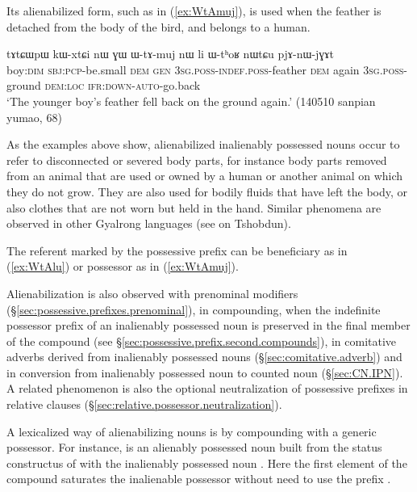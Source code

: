 Its alienabilized form, such as  in (\ref{ex:WtAmuj}), is used when the feather is detached from the body of the bird, and belongs to a human.
  
\begin{exe}
\ex \label{ex:WtAmuj}
 \gll tɤtɕɯpɯ kɯ-xtɕi nɯ ɣɯ ɯ-tɤ-muj nɯ li ɯ-tʰoʁ nɯtɕu pjɤ-nɯ-jɣɤt  \\
 boy:\textsc{dim} \textsc{sbj}:\textsc{pcp}-be.small \textsc{dem} \textsc{gen} \textsc{3sg}.\textsc{poss}-\textsc{indef}.\textsc{poss}-feather \textsc{dem} again \textsc{3sg}.\textsc{poss}-ground \textsc{dem}:\textsc{loc} \textsc{ifr}:\textsc{down}-\textsc{auto}-go.back  \\
 \glt `The younger boy's feather fell back on the ground again.' (140510 sanpian yumao, 68)
\end{exe}
 
As the examples above show, alienabilized inalienably possessed nouns occur to refer to disconnected or severed body parts, for instance body parts removed from an animal that are used or owned by a human or another animal on which they do not grow. They are also used for bodily fluids that have left the body, or also clothes that are not worn but held in the hand. Similar phenomena are observed in other Gyalrong languages (see \citealt[140]{jackson98morphology} on Tshobdun).

The referent marked by the possessive prefix can be beneficiary as in (\ref{ex:WtAlu}) or possessor as in (\ref{ex:WtAmuj}).
 
Alienabilization is also observed with prenominal modifiers (§\ref{sec:possessive.prefixes.prenominal}), in compounding, when the indefinite possessor prefix of an inalienably possessed noun is preserved in the final member of the compound (see §\ref{sec:possessive.prefix.second.compounds}), in comitative adverbs derived from inalienably possessed nouns (§\ref{sec:comitative.adverb}) and in conversion from inalienably possessed noun to counted noun (§\ref{sec:CN.IPN}). A related phenomenon is also the optional neutralization of possessive prefixes in relative clauses (§\ref{sec:relative.possessor.neutralization}).
 
A lexicalized way of alienabilizing nouns is by compounding with a generic possessor. For instance,  is an alienably possessed noun built from the status constructus of  with the inalienably possessed noun . Here the first element of the compound  saturates the inalienable possessor without need to use the prefix .
 
